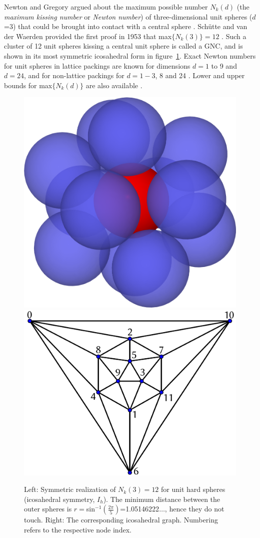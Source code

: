 Newton and Gregory argued about the maximum possible number $N_k(d)$ (the
\textit{maximum kissing number} or \textit{Newton number}) of three-dimensional
unit spheres ($d$=3) that could be brought into contact with a central sphere
\autocite{Pfender_KissingNumbersSphere_2004}. Sch\"utte and van der Waerden
provided the first proof in 1953 that max$\{N_k(3)\}=12$
\autocite{Schutte_ProblemdreizehnKugeln_1952}. Such a cluster of 12 unit
spheres kissing a central unit sphere is called a \ac{GNC}, and is shown in its
most symmetric icosahedral form in figure~\ref{fig:GN}. Exact Newton numbers
for unit spheres in lattice packings are known for dimensions $d=1$ to 9 and
$d=24$, and for non-lattice packings for $d=1-3$, 8 and 24
\autocite{Conway_SpherePackingsLattices_1999,Musin_proof24cellconjecture_2018}.  Lower and upper
bounds for max$\{N_k(d)\}$ are also available
\autocite{Mittelmann_Highaccuracysemidefiniteprogramming_2010,Conway_SpherePackingsLattices_1999}. 
\begin{figure}[htb]
    \centering
    \includegraphics[width=.4\textwidth]{gregory-newton/Kissing-3d.png} \quad
    \includegraphics[width=.45\textwidth]{gregory-newton/ico.pdf}
    \caption{Left: Symmetric realization of $N_k(3)=12$ for unit hard spheres
    (icosahedral symmetry, $I_h$).  The minimum distance between the outer
    spheres is $r=$sin$^{-1}\left(\frac{2\pi}{5}\right)$=1.05146222$\dots$,
    hence they do not touch. Right: The corresponding icosahedral graph.
    Numbering refers to the respective node index.}
    \label{fig:GN}
\end{figure}

